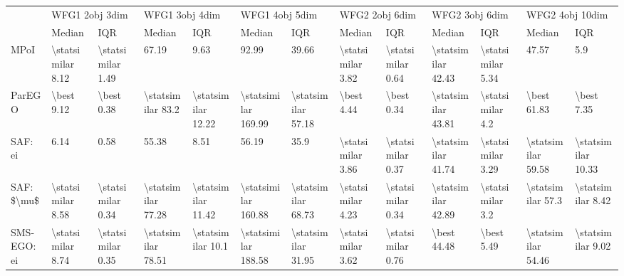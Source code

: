 \begin{tabular}{lllllllllllll}
\toprule
{} & \multicolumn{2}{l}{WFG1 2obj 3dim} & \multicolumn{2}{l}{WFG1 3obj 4dim} & \multicolumn{2}{l}{WFG1 4obj 5dim} & \multicolumn{2}{l}{WFG2 2obj 6dim} & \multicolumn{2}{l}{WFG2 3obj 6dim} & \multicolumn{2}{l}{WFG2 4obj 10dim} \\
{} &             Median &                IQR &              Median &                 IQR &               Median &                 IQR &             Median &                IQR &              Median &                IQR &              Median &                 IQR \\
\midrule
MPoI           &  \textbackslash statsimilar 8.12 &  \textbackslash statsimilar 1.49 &               67.19 &                9.63 &                92.99 &               39.66 &  \textbackslash statsimilar 3.82 &  \textbackslash statsimilar 0.64 &  \textbackslash statsimilar 42.43 &  \textbackslash statsimilar 5.34 &               47.57 &                 5.9 \\
ParEGO         &         \textbackslash best 9.12 &         \textbackslash best 0.38 &   \textbackslash statsimilar 83.2 &  \textbackslash statsimilar 12.22 &  \textbackslash statsimilar 169.99 &  \textbackslash statsimilar 57.18 &         \textbackslash best 4.44 &         \textbackslash best 0.34 &  \textbackslash statsimilar 43.81 &   \textbackslash statsimilar 4.2 &         \textbackslash best 61.83 &          \textbackslash best 7.35 \\
SAF: ei        &               6.14 &               0.58 &               55.38 &                8.51 &                56.19 &                35.9 &  \textbackslash statsimilar 3.86 &  \textbackslash statsimilar 0.37 &  \textbackslash statsimilar 41.74 &  \textbackslash statsimilar 3.29 &  \textbackslash statsimilar 59.58 &  \textbackslash statsimilar 10.33 \\
SAF: \$\textbackslash mu\$     &  \textbackslash statsimilar 8.58 &  \textbackslash statsimilar 0.34 &  \textbackslash statsimilar 77.28 &  \textbackslash statsimilar 11.42 &  \textbackslash statsimilar 160.88 &  \textbackslash statsimilar 68.73 &  \textbackslash statsimilar 4.23 &  \textbackslash statsimilar 0.34 &  \textbackslash statsimilar 42.89 &   \textbackslash statsimilar 3.2 &   \textbackslash statsimilar 57.3 &   \textbackslash statsimilar 8.42 \\
SMS-EGO: ei    &  \textbackslash statsimilar 8.74 &  \textbackslash statsimilar 0.35 &  \textbackslash statsimilar 78.51 &   \textbackslash statsimilar 10.1 &  \textbackslash statsimilar 188.58 &  \textbackslash statsimilar 31.95 &  \textbackslash statsimilar 3.62 &  \textbackslash statsimilar 0.76 &         \textbackslash best 44.48 &         \textbackslash best 5.49 &  \textbackslash statsimilar 54.46 &   \textbackslash statsimilar 9.02 \\

\end{tabular}
